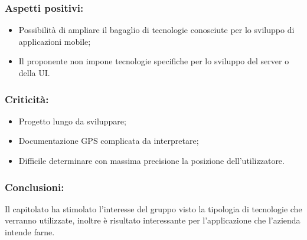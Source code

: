 	\subsubsection{Aspetti positivi:}
		\begin{itemize}
			\item Possibilità di ampliare il bagaglio di tecnologie conosciute per lo sviluppo di applicazioni mobile;
			\item Il proponente non impone tecnologie specifiche per lo sviluppo del server o
			della UI.
		\end{itemize}

	\subsubsection{Criticità:}
		\begin{itemize}
			\item Progetto lungo da sviluppare;
			\item Documentazione GPS complicata da interpretare;
			\item Difficile determinare con massima precisione la posizione dell'utilizzatore.
		\end{itemize}

	\subsubsection{Conclusioni:}
		Il capitolato ha stimolato l'interesse del gruppo visto la tipologia di tecnologie che verranno utilizzate, inoltre è risultato interessante per l'applicazione che l'azienda intende farne.
